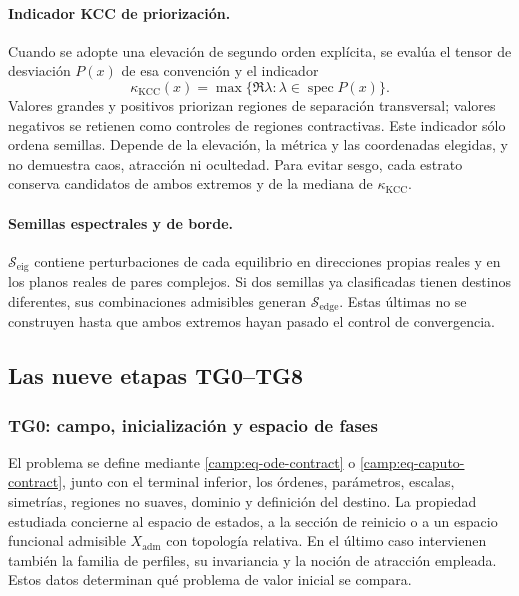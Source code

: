 \paragraph{Indicador KCC de priorización.}
Cuando se adopte una elevación de segundo orden explícita, se evalúa el
tensor de desviación \(P(x)\) de esa convención y el indicador
\begin{equation}
 \kappa_{\mathrm{KCC}}(x)=
 \max\{\Re\lambda:\lambda\in\operatorname{spec}P(x)\}.
 \label{camp:eq-kcc-score}
\end{equation}
Valores grandes y positivos priorizan regiones de separación transversal;
valores negativos se retienen como controles de regiones contractivas. Este
indicador sólo ordena semillas. Depende de la elevación, la métrica y las
coordenadas elegidas, y no demuestra caos, atracción ni ocultedad. Para evitar
sesgo, cada estrato conserva candidatos de ambos extremos y de la mediana de
\(\kappa_{\mathrm{KCC}}\).

\paragraph{Semillas espectrales y de borde.}
\(\mathcal S_{\mathrm{eig}}\) contiene perturbaciones de cada equilibrio en
direcciones propias reales y en los planos reales de pares complejos. Si dos
semillas ya clasificadas tienen destinos diferentes, sus combinaciones
admisibles generan \(\mathcal S_{\mathrm{edge}}\). Estas últimas no se
construyen hasta que ambos extremos hayan pasado el control de convergencia.

\subsection{Las nueve etapas TG0--TG8}
\label{camp:etapas}

\subsubsection*{TG0: campo, inicialización y espacio de fases}

El problema se define mediante \cref{camp:eq-ode-contract} o
\cref{camp:eq-caputo-contract}, junto con el terminal inferior, los órdenes,
parámetros, escalas, simetrías, regiones no suaves, dominio y definición del
destino. La propiedad estudiada concierne al espacio de
estados, a la sección de reinicio o a un espacio funcional admisible
\(X_{\mathrm{adm}}\) con topología relativa. En el último caso intervienen
también la familia de perfiles, su invariancia y la noción de atracción
empleada. Estos datos determinan qué problema de valor inicial se compara.

